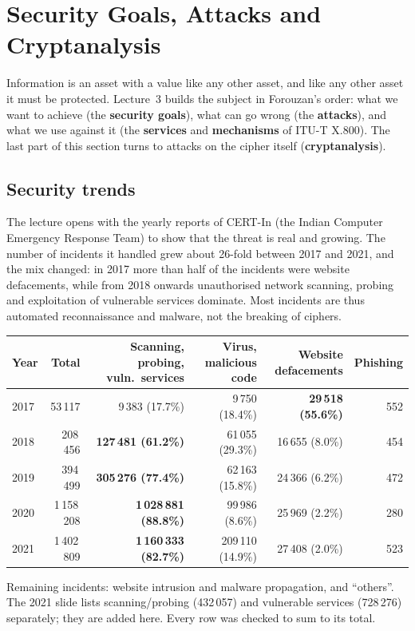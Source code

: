 \section{Security Goals, Attacks and Cryptanalysis}\label{sec:attacks}
\usetikzlibrary{backgrounds}

Information is an asset with a value like any other asset, and like any other asset it must be protected. Lecture~3 builds the subject in Forouzan's order: what we want to achieve (the \textbf{security goals}), what can go wrong (the \textbf{attacks}), and what we use against it (the \textbf{services} and \textbf{mechanisms} of ITU-T X.800). The last part of this section turns to attacks on the cipher itself (\textbf{cryptanalysis}).

\subsection{Security trends}
The lecture opens with the yearly reports of CERT-In (the Indian Computer Emergency Response Team) to show that the threat is real and growing. The number of incidents it handled grew about 26-fold between 2017 and 2021, and the mix changed: in 2017 more than half of the incidents were website defacements, while from 2018 onwards unauthorised network scanning, probing and exploitation of vulnerable services dominate. Most incidents are thus automated reconnaissance and malware, not the breaking of ciphers.
\begin{center}\small
\begin{tabular}{@{}lrrrrr@{}}
\toprule
Year & Total & Scanning, probing, vuln.\ services & Virus, malicious code & Website defacements & Phishing\\
\midrule
2017 & 53\,117 & 9\,383 (17.7\%) & 9\,750 (18.4\%) & \textbf{29\,518 (55.6\%)} & 552\\
2018 & 208\,456 & \textbf{127\,481 (61.2\%)} & 61\,055 (29.3\%) & 16\,655 (8.0\%) & 454\\
2019 & 394\,499 & \textbf{305\,276 (77.4\%)} & 62\,163 (15.8\%) & 24\,366 (6.2\%) & 472\\
2020 & 1\,158\,208 & \textbf{1\,028\,881 (88.8\%)} & 99\,986 (8.6\%) & 25\,969 (2.2\%) & 280\\
2021 & 1\,402\,809 & \textbf{1\,160\,333 (82.7\%)} & 209\,110 (14.9\%) & 27\,408 (2.0\%) & 523\\
\bottomrule
\end{tabular}
\end{center}
{\footnotesize Remaining incidents: website intrusion and malware propagation, and ``others''. The 2021 slide lists scanning/probing (432\,057) and vulnerable services (728\,276) separately; they are added here. Every row was checked to sum to its total.}

